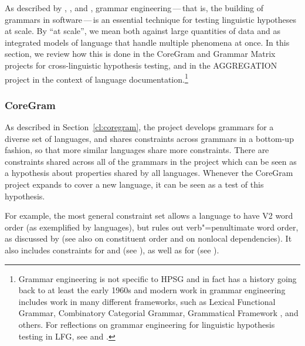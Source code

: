 \documentclass[output=paper,biblatex,babelshorthands,newtxmath,draftmode,colorlinks,citecolor=brown]{langscibook}
\begin{document}
%
%
As described by \citet[]{Mueller99a}, \citet{Bender2008c}, and \citet{BFO2011a-u},
grammar engineering\,---\,that is, the building of grammars in software\,---\,is
an essential technique for testing linguistic hypotheses at scale. By
``at scale'', we mean both against large quantities of data and as
integrated models of language that handle multiple phenomena at
once. In this section, we review how this is done in the CoreGram
and Grammar Matrix projects for cross-linguistic hypothesis testing,
and in the AGGREGATION project in the context of language
documentation.\footnote{Grammar engineering is not specific to HPSG and
in fact has a history going back to at least the early 1960s \citep{Kay:63,ZFHW65a,Petrick65a-u,FBDPM71a-u}
and modern work in grammar engineering includes work in many different frameworks, such as Lexical Functional Grammar\indexlfg \citep{BKNS99a-ed}, Combinatory Categorial
Grammar\indexccg \citep{BCPW2007a}, Grammatical Framework \citep{Ranta:09}, and others.
For reflections on grammar engineering for linguistic hypothesis testing
in LFG, see \citet{BKNS99a-ed} and \citet{King:16}.}
%


\subsubsection{CoreGram}
\label{cl:lang-doc:coregram}

As described in Section~\ref{cl:coregram},
the  project develops grammars for a diverse set of languages,
and shares constraints across grammars in a bottom-up fashion, so that more
similar languages share more constraints. There are constraints
shared across all of the grammars in the project which can be seen
as a hypothesis about properties shared by all languages.
Whenever the CoreGram project expands to cover a new language,
it can be seen as a test of this hypothesis.

For example, the most general constraint set
allows a language to have V2 word order
(as exemplified by  languages),
but rules out verb"=penultimate word order,
as discussed by \citet[--46]{MuellerCoreGram}
(see also  on constituent order and  on nonlocal dependencies).
It also includes constraints for  and 
(see ),
as well as for 
(see ).
\end{document}
